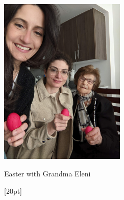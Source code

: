 \begin{marginfigure}[20pt]
  \includegraphics[width=60mm]{monanteras/images/Easter eggs with grandma.jpg}
  \caption{Easter with Grandma Eleni}
\end{marginfigure}[20pt]

